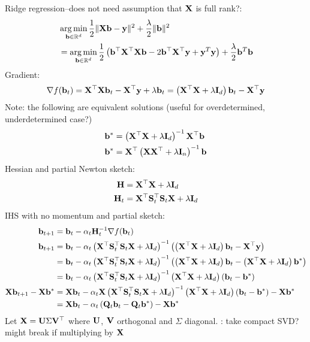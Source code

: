 \documentclass[10pt]{article}
\begin{document}
Ridge regression--does not need assumption that $\mathbf{X}$ is full rank?:
\begin{align*}
&\operatorname*{arg\,min}_{\mathbf{b}\in\mathbb{R}^d} \frac{1}{2}\|\mathbf{X}\mathbf{b}-\mathbf{y}\|^2 + \frac{\lambda}{2}\|\mathbf{b}\|^2 \\
&= \operatorname*{arg\,min}_{\mathbf{b}\in\mathbb{R}^d} \frac{1}{2}\left(\mathbf{b}^\top\mathbf{X}^\top\mathbf{X}\mathbf{b} - 2\mathbf{b}^\top\mathbf{X}^\top\mathbf{y} + \mathbf{y}^T\mathbf{y}\right) + \frac{\lambda}{2}\mathbf{b}^T\mathbf{b} \\
\end{align*}
Gradient:
\[
\nabla f(\mathbf{b}_t) = \mathbf{X}^\top\mathbf{X}\mathbf{b}_t - \mathbf{X}^\top\mathbf{y} + \lambda\mathbf{b}_t = \left(\mathbf{X}^\top\mathbf{X}+\lambda\mathbf{I}_d\right)\mathbf{b}_t - \mathbf{X}^\top\mathbf{y}
\]
Note: the following are equivalent solutions (useful for overdetermined, underdetermined case?)
\begin{align*}
\mathbf{b}^* &= \left(\mathbf{X}^\top\mathbf{X}+\lambda\mathbf{I}_d\right)^{-1}\mathbf{X}^\top\mathbf{b} \\
\mathbf{b}^* &= \mathbf{X}^\top\left(\mathbf{X}\mathbf{X}^\top+\lambda\mathbf{I}_n\right)^{-1}\mathbf{b}
\end{align*}
Hessian and partial Newton sketch:
\begin{align*}
\mathbf{H} &= \mathbf{X}^\top\mathbf{X}+\lambda\mathbf{I}_d \\
\mathbf{H}_t &= \mathbf{X}^\top\mathbf{S}_t^\top\mathbf{S}_t\mathbf{X} + \lambda\mathbf{I}_d
\end{align*}
IHS with no momentum and partial sketch:
\begin{align*}
\mathbf{b}_{t+1} &= \mathbf{b}_t - \alpha_t\mathbf{H}_t^{-1}\nabla f(\mathbf{b}_t) \\
\mathbf{b}_{t+1} &= \mathbf{b}_t - \alpha_t\left(\mathbf{X}^\top\mathbf{S}_t^\top\mathbf{S}_t\mathbf{X} + \lambda\mathbf{I}_d\right)^{-1}\left(\left(\mathbf{X}^\top\mathbf{X}+\lambda\mathbf{I}_d\right)\mathbf{b}_t-\mathbf{X}^\top\mathbf{y}\right) \\
&= \mathbf{b}_t - \alpha_t\left(\mathbf{X}^\top\mathbf{S}_t^\top\mathbf{S}_t\mathbf{X} + \lambda\mathbf{I}_d\right)^{-1}\left(\left(\mathbf{X}^\top\mathbf{X}+\lambda\mathbf{I}_d\right)\mathbf{b}_t-\left(\mathbf{X}^\top\mathbf{X}+\lambda\mathbf{I}_d\right)\mathbf{b}^*\right) \\
&= \mathbf{b}_t - \alpha_t\left(\mathbf{X}^\top\mathbf{S}_t^\top\mathbf{S}_t\mathbf{X} + \lambda\mathbf{I}_d\right)^{-1}\left(\mathbf{X}^\top\mathbf{X}+\lambda\mathbf{I}_d\right)\left(\mathbf{b}_t-\mathbf{b}^*\right) \\
\mathbf{X}\mathbf{b}_{t+1} - \mathbf{X}\mathbf{b}^* &= \mathbf{X}\mathbf{b}_t - \alpha_t\mathbf{X}\left(\mathbf{X}^\top\mathbf{S}_t^\top\mathbf{S}_t\mathbf{X} + \lambda\mathbf{I}_d\right)^{-1}\left(\mathbf{X}^\top\mathbf{X}+\lambda\mathbf{I}_d\right)\left(\mathbf{b}_t-\mathbf{b}^*\right) - \mathbf{X}\mathbf{b}^* \\
&= \mathbf{X}\mathbf{b}_t - \alpha_t\left(\mathbf{Q}_t\mathbf{b}_t-\mathbf{Q}_t\mathbf{b}^*\right) - \mathbf{X}\mathbf{b}^*
\end{align*}
Let $\mathbf{X} = \mathbf{U}\Sigma\mathbf{V}^\top$ where $\mathbf{U}$, $\mathbf{V}$ orthogonal and $\Sigma$ diagonal. \todo: take compact SVD? might break if multiplying by $\mathbf{X}$
\end{document}
